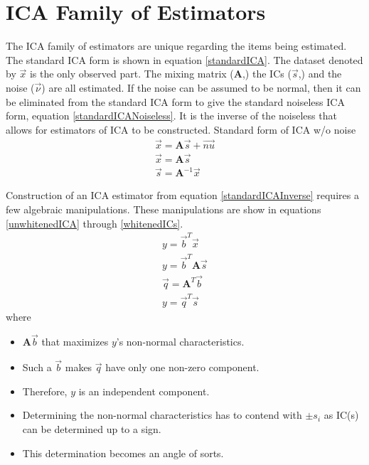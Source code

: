 \documentclass[12pt ]{article}
\begin{document}
\section{ICA Family of Estimators}\label{mutual-independence}
The ICA family of estimators are unique regarding the items being estimated.   The standard ICA form is shown in equation \ref{standardICA}.  The dataset denoted by $\vec{x}$ is the only observed part.  The mixing matrix ($\mathbf{A}$,) the ICs ($\vec{s}$,) and the noise ($\vec{\nu}$) are all estimated.  If the noise can be assumed to be normal, then it can be eliminated from the standard ICA form to give the standard noiseless ICA form, equation \ref{standardICANoiseless}.  It is the inverse of the noiseless that allows for estimators of ICA to be constructed.
Standard form of ICA w/o noise
\begin{eqnarray}
\vec{x} = \mathbf{A}\vec{s} + \vec{nu} \label{standardICA} \\
\vec{x} = \mathbf{A}\vec{s} \label{standardICANoiseless} \\
\vec{s} = \mathbf{A}^{-1} \vec{x} \label{standardICAInverse} 
\end{eqnarray}

Construction of an ICA estimator from equation \ref{standardICAInverse} requires a few algebraic manipulations.  These manipulations are show in equations \ref{unwhitenedICA} through \ref{whitenedICs}.
\begin{eqnarray}
y = \vec{b}^T \vec{x} \label{unwhitenedICA} \\
y = \vec{b}^T \mathbf{A}\vec{s} \\
\vec{q} = \mathbf{A}^{T} \vec{b} \\
y = \vec{q}^T \vec{s} \label{whitenedICs}
\end{eqnarray}
where
\begin{itemize}
\item $\mathbf{A}\vec{b}$ that maximizes $y$'s non-normal characteristics.
\item Such a $\vec{b}$ makes $\vec{q}$ have only one non-zero component.
\item Therefore, $y$ is an independent component.
\item Determining the non-normal characteristics has to contend with $\pm s_i$ as IC(s) can be determined up to a sign. 
\item This determination becomes an angle of sorts.  
\end{itemize}
\end{document}
